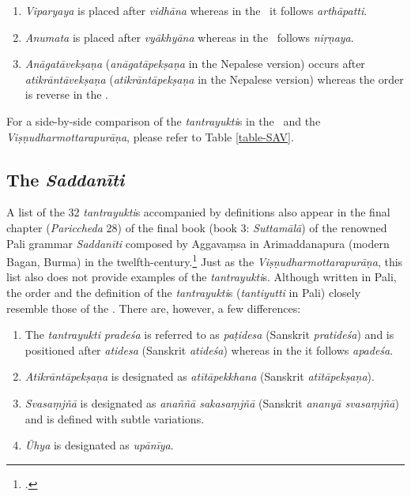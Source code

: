 \begin{enumerate}

	\item \emph{Viparyaya} is placed after \emph{vidhāna} whereas in the \SS\  it 
	follows \emph{arthāpatti}.
	
	\item \emph{Anumata} is placed after \emph{vyākhyāna} whereas in the \SS\  
	follows \emph{niṛṇaya}.

	\item \emph{Anāgatāvekṣaṇa} (\emph{anāgatāpekṣaṇa} in the Nepalese 
	version) occurs after \emph{atikrāntāvekṣaṇa} (\emph{atikrāntāpekṣaṇa} in the 
	Nepalese version) whereas the order is reverse in the \SS.
	
\end{enumerate}

For a side-by-side comparison of the \emph{tantrayukti}s in the \SS\  and the 
\emph{Viṣṇudharmottarapurāṇa}, please refer to Table \ref{table-SAV}.


\subsection{The \emph{Saddanīti}}
A list of the 32 \emph{tantrayukti}s accompanied by definitions also appear in the final chapter (\emph{Pariccheda} 28) of the final book (book 3: \emph{Suttamālā}) of the renowned Pali grammar \emph{Saddanīti} composed by Aggavaṃsa in Arimaddanapura (modern Bagan, Burma) in the twelfth-century.\footnote{\cite[920--921]{smit-1930}.} Just as the \emph{Viṣṇudharmottarapurāṇa}, this list also does not provide examples of the \emph{tantrayukti}s. Although written in Pali, the order and the definition of the \emph{tantrayukti}s (\emph{tantiyutti} in Pali) closely resemble those of the \SS. There are, however, a few differences:

	\begin{enumerate}

\item The \emph{tantrayukti} \emph{pradeśa} is referred to as \emph{paṭidesa} (Sanskrit \emph{pratideśa}) and is positioned after \emph{atidesa} (Sanskrit \emph{atideśa}) whereas in the \SS it follows \emph{apadeśa}. 

\item \emph{Atikrāntāpekṣaṇa} is designated as \emph{atītāpekkhana} (Sanskrit \emph{atītāpekṣaṇa}).

\item \emph{Svasaṃjñā} is designated as \emph{anaññā sakasaṃjñā} (Sanskrit \emph{ananyā svasaṃjñā}) and is defined with subtle variations.

\item \emph{Ūhya} is designated as \emph{upānīya}. 
	
	\end{enumerate}

